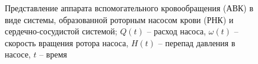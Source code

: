 \begin{figure}[ht]
  \begin{minipage}[ht]{0.43\linewidth}
  \end{minipage}
  \hfill
  \begin{minipage}[ht]{0.55\linewidth}
  \end{minipage}
  \caption{Представление аппарата вспомогательного кровообращения (АВК) в виде системы, образованной роторным насосом крови (РНК) и сердечно-сосудистой системой; $Q(t)$ -- расход насоса, $\omega(t)$ -- скорость вращения ротора насоса, $H(t)$ -- перепад давления в насосе, $t$ -- время}
  \label{img:system_links}  


\end{figure}

